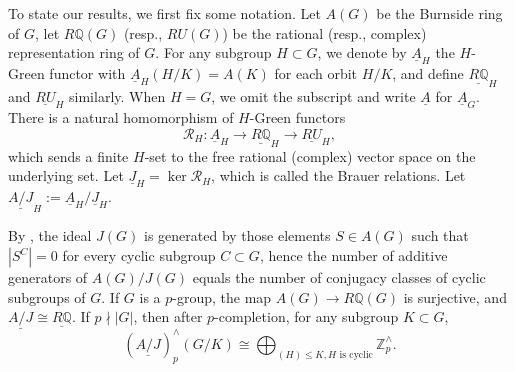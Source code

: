 \documentclass{amsart}
\theoremstyle{plain}
\theoremstyle{definition}
\theoremstyle{remark}
\begin{document}
To state our results, we first fix some notation. Let $A(G)$ be the Burnside ring of $G$, let $R\mathbb{Q}(G)$ (resp., $RU(G)$) be the rational (resp., complex) representation ring of $G$. For any subgroup $H\subset G$, we denote by $\underline{A}_H$ the $H$-Green functor with $\underline{A}_H(H/K)=A(K)$ for each orbit $H/K$, and define $\underline{R\mathbb{Q}}_H$ and $\underline{RU}_H$ similarly. When $H=G$, we omit the subscript and write $\underline{A}$ for $\underline{A}_G$. There is a natural homomorphism of $H$-Green functors 
\[
\mathcal{R}_H: \underline{A}_H\longrightarrow \underline{R\mathbb{Q}}_H\longrightarrow \underline{RU}_H,
\] 
which sends a finite $H$-set to the free rational (complex) vector space on the underlying set. Let $\underline{J}_H=\ker \mathcal{R}_H$, which is called the Brauer relations. Let $\underline{A/J}_H := \underline{A}_H/\underline{J}_H$.

By \cite[Proposition 3.8]{szymik2013chromatic}, the ideal $J(G)$ is generated by those elements $S\in A(G)$ such that $|S^C|=0$ for every cyclic subgroup $C\subset G$, hence the number of additive generators of $A(G)/J(G)$ equals the number of conjugacy classes of cyclic subgroups of $G$. If $G$ is a $p$-group, the map $A(G)\to R\mathbb{Q}(G)$ is surjective, and $\underline{A/J}\cong \underline{R\mathbb{Q}}$. If $p\nmid |G|$, then after $p$-completion, for any subgroup $K\subset G$,
\[(\underline{A/J})_p^\wedge (G/K) \cong \bigoplus_{(H)\leq K, H \text{ is cyclic}}\mathbb{Z}_p^\wedge.\]
\end{document}
